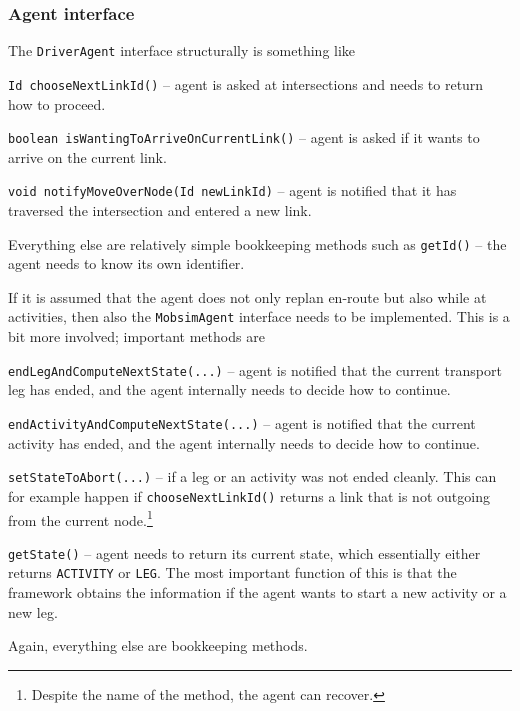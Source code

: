 \subsubsection{Agent interface}

The \lstinline$DriverAgent$ interface structurally is something like
\begin{compactitem}

\item \lstinline$Id chooseNextLinkId()$ -- agent is asked at intersections and needs to return how to proceed.




\item \lstinline$boolean isWantingToArriveOnCurrentLink()$ -- agent is asked if it wants to arrive on the current link.

\item \lstinline$void notifyMoveOverNode(Id newLinkId)$ -- agent is notified that it has traversed the intersection and entered a new link.

\end{compactitem}
Everything else are relatively simple bookkeeping methods such as \lstinline$getId()$ -- the agent needs to know its own identifier.

If it is assumed that the agent does not only replan en-route but also while at activities, then also the \lstinline$MobsimAgent$ interface needs to be implemented.  This is a bit more involved; important methods are
\begin{compactitem}

\item \lstinline$endLegAndComputeNextState(...)$ -- agent is notified that the current transport leg has ended, and the agent internally needs to decide how to continue.

\item \lstinline$endActivityAndComputeNextState(...)$ -- agent is notified that the current activity has ended, and the agent internally needs to decide how to continue.

\item \lstinline$setStateToAbort(...)$ -- if a leg or an activity was not ended cleanly.  This can for example happen if \lstinline$chooseNextLinkId()$ returns a link that is not outgoing from the current node.\footnote{%
%
Despite the name of the method, the agent can recover.  %
}

\item \lstinline$getState()$ -- agent needs to return its current state, which essentially either returns \lstinline$ACTIVITY$ or \lstinline$LEG$.  The most important function of this is that the framework obtains the information if the agent wants to start a new activity or a new leg.

\end{compactitem}
Again, everything else are bookkeeping methods.

